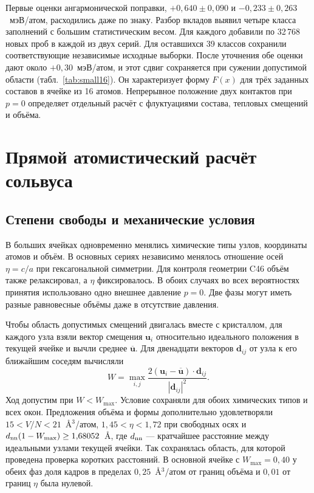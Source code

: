 \documentclass[11pt,a4paper]{article}
\begin{document}
Первые оценки ангармонической поправки, $+0{,}640\pm0{,}090$ и
$-0{,}233\pm0{,}263$~мэВ/атом, расходились даже по знаку. Разбор вкладов
выявил четыре класса заполнений с большим статистическим весом. Для каждого
добавили по 32\,768 новых проб в каждой из двух серий. Для оставшихся
39 классов сохранили соответствующие независимые исходные выборки. После
уточнения обе оценки дают около $+0{,}30$~мэВ/атом, и этот сдвиг сохраняется
при сужении допустимой области (табл.~\ref{tab:small16}). Он характеризует
форму $F(x)$ для трёх заданных составов в ячейке из 16 атомов. Непрерывное
положение двух контактов при $p=0$ определяет отдельный расчёт с флуктуациями
состава, тепловых смещений и объёма.

\section{Прямой атомистический расчёт сольвуса}
\label{sec:ensemble}

\subsection{Степени свободы и механические условия}
В больших ячейках одновременно менялись химические типы узлов, координаты
атомов и объём. В основных сериях независимо менялось отношение осей
\(\eta=c/a\) при гексагональной симметрии. Для контроля геометрии C46
объём также релаксировал, а \(\eta\) фиксировалось. В обоих случаях
во всех вероятностях принятия использовано одно внешнее давление \(p=0\).
Две фазы могут иметь разные равновесные объёмы даже в отсутствие давления.

Чтобы область допустимых смещений двигалась вместе с кристаллом,
для каждого узла взяли вектор смещения \(\mathbf u_i\) относительно
идеального положения в текущей ячейке и вычли среднее
\(\overline{\mathbf u}\). Для двенадцати векторов \(\mathbf d_{ij}\)
от узла к его ближайшим соседям вычисляли
\[
 W=\max_{i,j}\frac{2(\mathbf u_i-\overline{\mathbf u})\cdot\mathbf d_{ij}}
                              {|\mathbf d_{ij}|^2}.
\]
Ход допустим при \(W<W_{\max}\). Условие сохраняли для обоих химических
типов и всех окон. Предложения объёма и формы дополнительно удовлетворяли
\(15<V/N<21\)~\AA$^3$/атом, \(1{,}45<\eta<1{,}72\) при свободных осях
и \(d_{\rm nn}(1-W_{\max})\ge 1{,}68052\)~\AA, где \(d_{\rm nn}\) —
кратчайшее расстояние между идеальными узлами текущей ячейки.
Так сохранялась область, для которой проведена проверка коротких расстояний.
В основной ячейке с \(W_{\max}=0{,}40\) у обеих фаз доля кадров в
пределах \(0{,}25\)~\AA$^3$/атом от границ объёма и \(0{,}01\) от
границ \(\eta\) была нулевой.
\end{document}
